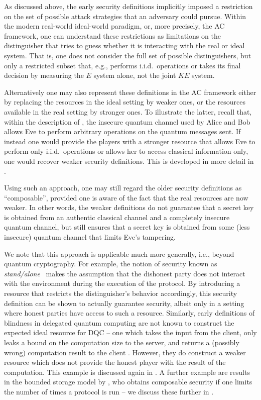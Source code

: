 As discussed above, the early security definitions implicitly imposed
a restriction on the set of possible attack strategies that an
adversary could pursue. Within the modern real-world ideal-world
paradigm, or, more precisely, the AC framework, one can understand
these restrictions as limitations on the distinguisher that tries to
guess whether it is interacting with the real or ideal system. That
is, one does not consider the full set of possible distinguishers, but
only a restricted subset that, e.g., performs i.i.d.\ operations or
takes its final decision by measuring the $E$ system alone, not the
joint $KE$ system.

Alternatively one may also represent these definitions in the AC
framework either by replacing the resources in the ideal setting by
weaker ones, or the resources available in the real setting by
stronger ones. To illustrate the latter, recall that, within the
description of , the insecure quantum channel
used by Alice and Bob allows Eve to perform arbitrary operations on
the quantum messages sent. If instead one would provide the players
with a stronger resource that allows Eve to perform only i.i.d.\
operations or allows her to access classical information only, one
would recover weaker security definitions. This is developed in more
detail in \secref{sec:alternative.memoryless}.

Using such an approach, one may still regard the older security
definitions as ``composable'', provided one is aware of the fact that
the real resources are now weaker. In other words, the weaker
definitions do not guarantee that a secret key is obtained from an
authentic classical channel and a completely insecure quantum channel,
but still ensures that a secret key is obtained from some (less
insecure) quantum channel that limits Eve's tampering.

We note that this approach is applicable much more generally, i.e.,
beyond quantum cryptography.  For example, the notion of security
known as \emph{stand\-/alone}~\cite{Gol04} makes the assumption that
the dishonest party does not interact with the environment during the
execution of the protocol. By introducing a resource that restricts
the distinguisher's behavior accordingly, this security definition can
be shown to actually guarantee security, albeit only in a setting
where honest parties have access to such a resource. Similarly, early
definitions of blindness in delegated quantum computing
\cite[DQC;][]{BFK09,FK17} are not known to construct the expected
ideal resource for DQC \--- one which takes the input from the client,
only leaks a bound on the computation size to the server, and returns
a (possibly wrong) computation result to the client
\cite{DFPR14}. However, they do construct a weaker resource which does
not provide the honest player with the result of the computation. This
example is discussed again in \secref{sec:dqc}. A further example are
results in the bounded storage model by \textcite{Unr11}, who obtains
composable security if one limits the number of times a protocol is
run \--- we discuss these further in \secref{sec:open.other}.


